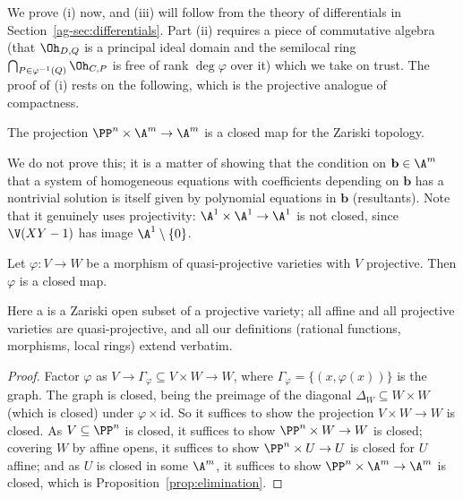 We prove (i) now, and (iii) will follow from the theory of differentials in Section~\ref{ag-sec:differentials}. Part (ii) requires a piece of commutative algebra (that $\Oh_{D,Q}$ is a principal ideal domain and the semilocal ring $\bigcap_{P \in \varphi^{-1}(Q)}\Oh_{C,P}$ is free of rank $\deg\varphi$ over it) which we take on trust. The proof of (i) rests on the following, which is the projective analogue of compactness.

\begin{proposition}\label{prop:elimination}
	The projection $\PP^n\times\A^m \to \A^m$ is a closed map for the Zariski topology.
\end{proposition}

We do not prove this; it is a matter of showing that the condition on $\mathbf b \in \A^m$ that a system of homogeneous equations with coefficients depending on $\mathbf b$ has a nontrivial solution is itself given by polynomial equations in $\mathbf b$ (resultants). Note that it genuinely uses projectivity: $\A^1 \times \A^1 \to \A^1$ is not closed, since $\V(XY - 1)$ has image $\A^1\setminus\{0\}$.

\begin{proposition}\label{prop:projclosed}
	Let $\varphi \colon V \to W$ be a morphism of quasi-projective varieties with $V$ projective. Then $\varphi$ is a closed map.
\end{proposition}

Here a  is a Zariski open subset of a projective variety; all affine and all projective varieties are quasi-projective, and all our definitions (rational functions, morphisms, local rings) extend verbatim.

\begin{proof}
	Factor $\varphi$ as $V \to \Gamma_\varphi \subseteq V\times W \to W$, where $\Gamma_\varphi = \{(x,\varphi(x))\}$ is the graph. The graph is closed, being the preimage of the diagonal $\Delta_W \subseteq W\times W$ (which is closed) under $\varphi\times\mathrm{id}$. So it suffices to show the projection $V \times W \to W$ is closed. As $V \subseteq \PP^n$ is closed, it suffices to show $\PP^n\times W \to W$ is closed; covering $W$ by affine opens, it suffices to show $\PP^n\times U \to U$ is closed for $U$ affine; and as $U$ is closed in some $\A^m$, it suffices to show $\PP^n \times \A^m \to \A^m$ is closed, which is Proposition~\ref{prop:elimination}.
\end{proof}

